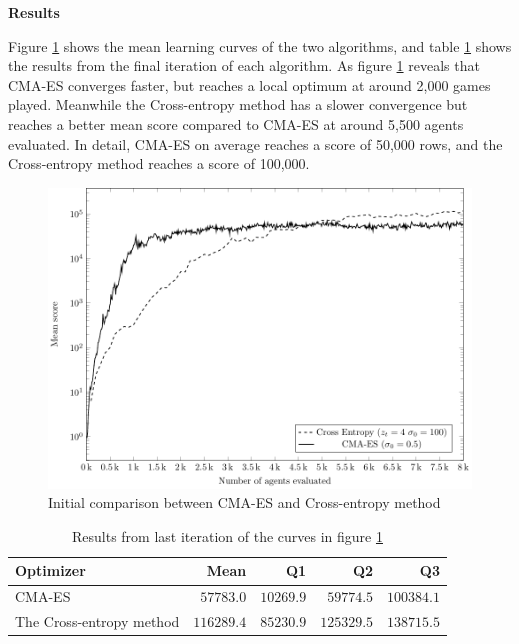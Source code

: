 \textbf{Results}

Figure \ref{fig:CMA_VS_CE_00} shows the mean learning curves of the two algorithms,
and table \ref{table:initialResultTable} shows the results from the final iteration of each algorithm.
As figure \ref{fig:CMA_VS_CE_00} reveals that CMA-ES converges faster,
but reaches a local optimum at around 2,000 games played. Meanwhile the Cross-entropy method has a 
slower convergence but reaches a better mean score compared to CMA-ES at around 5,500
agents evaluated. In detail, CMA-ES on average reaches a score of 50,000 rows, and
the Cross-entropy method reaches a score of 100,000.\\

\begin{figure}[H]
\begin{center}
\includegraphics[scale=0.8]{plots/cmaCePlot}
\end{center}
\caption{Initial comparison between CMA-ES and Cross-entropy method \label{fig:CMA_VS_CE_00}}
\end{figure}

\begin{table}[H]
\centering
\small
\begin{tabular}{l r r r r}
Optimizer & Mean & Q1 & Q2 & Q3\\
\hline
CMA-ES  & $57783.0$ & $10269.9$ & $59774.5$ & $100384.1$\\
The Cross-entropy method & $116289.4$ & $85230.9$ & $125329.5$ & $138715.5$\\
\end{tabular}
\caption{Results from last iteration of the curves in figure \ref{fig:CMA_VS_CE_00}
\label{table:initialResultTable}}
\end{table}


